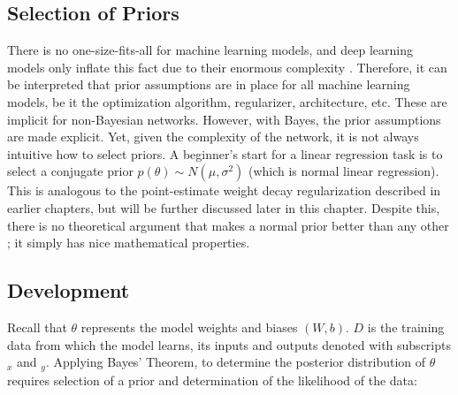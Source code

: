 \subsection{Selection of Priors}

There is no one-size-fits-all for machine learning models, and deep learning models only inflate this fact due to their enormous complexity \cite{Goodfellow-et-al-2016}.  Therefore, it can be interpreted \cite{Jospin} that prior assumptions are in place for all machine learning models, be it the optimization algorithm, regularizer, architecture, etc. These are implicit for non-Bayesian networks.  However, with Bayes, the prior assumptions are made explicit.  Yet, given the complexity of the network, it is not always intuitive how to select priors.  A beginner's start for a linear regression task is to select a conjugate prior $p(\theta) \sim N(\mu,\sigma^2)$ (which is normal linear regression).  This is analogous to the point-estimate weight decay regularization described in earlier chapters, but will be further discussed later in this chapter.  Despite this, there is no theoretical argument that makes a normal prior better than any other \cite{silvestro2020prior}; it simply has nice mathematical properties.


\subsection{Development}

Recall that $\theta$ represents the model weights and biases $(W,b)$.  $D$ is the training data from which the model learns, its inputs and outputs denoted with subscripts $_x$ and $_y$.  Applying Bayes' Theorem, to determine the posterior distribution of $\theta$ requires selection of a prior and determination of the likelihood of the data:

